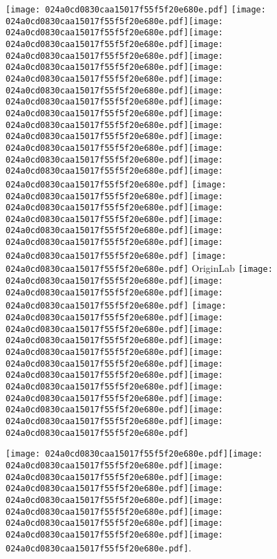 \documentclass{article}
\newcommand{\origpg}[2]{\texttt{[image: 024a0cd0830caa15017f55f5f20e680e.pdf]}}
\begin{document}
{\vspace{1.831pt}\hspace{18.094pt}\origpg6{103.4pt 145.31pt 110.82pt 161.45pt} \origpg6{121.46pt 145.31pt 132.12pt 161.45pt}\origpg6{132.07pt 145.31pt 139.91pt 161.45pt}\hspace{-0.371pt}\origpg6{139.54pt 145.31pt 146.71pt 161.45pt}\origpg6{146.76pt 145.31pt 155.39pt 161.45pt}\origpg6{155.39pt 145.31pt 163.46pt 161.45pt}\origpg6{163.38pt 145.31pt 171.45pt 161.45pt}\hspace{-0.113pt}\origpg6{171.34pt 145.31pt 178.39pt 161.45pt}\origpg6{178.33pt 145.31pt 186.96pt 161.45pt}\hspace{-0.21pt}\origpg6{186.75pt 145.31pt 194.82pt 161.45pt}\origpg6{194.92pt 145.31pt 202.99pt 161.45pt}\hspace{-0.113pt}\origpg6{202.88pt 145.31pt 210.49pt 161.45pt}\hspace{-0.387pt}\origpg6{210.11pt 145.31pt 217.27pt 161.45pt}\origpg6{217.32pt 145.31pt 225.96pt 161.45pt}\origpg6{225.96pt 145.31pt 234.59pt 161.45pt}\origpg6{234.66pt 145.31pt 241.82pt 161.45pt} \origpg6{255.36pt 145.31pt 263.58pt 161.45pt}\origpg6{263.58pt 145.31pt 270.75pt 161.45pt}\hspace{-0.21pt}\origpg6{270.54pt 145.31pt 279.17pt 161.45pt}\origpg6{279.17pt 145.31pt 287.81pt 161.45pt}\origpg6{287.87pt 145.31pt 298.72pt 161.45pt}\hspace{0.12pt}\origpg6{298.84pt 145.31pt 306.91pt 161.45pt} \origpg6{320.52pt 145.31pt 328.14pt 161.45pt} OriginLab \origpg6{422.23pt 145.31pt 430.44pt 161.45pt}\origpg6{430.44pt 145.31pt 438.5pt 161.45pt}\hspace{-0.129pt}\origpg6{438.37pt 145.31pt 445.79pt 161.45pt} \origpg6{459.54pt 145.31pt 468.18pt 161.45pt}\origpg6{468.18pt 145.31pt 476.25pt 161.45pt}\hspace{0.387pt}\origpg6{476.64pt 145.31pt 483.8pt 161.45pt}\origpg6{483.85pt 145.31pt 491.91pt 161.45pt}\origpg6{491.81pt 145.31pt 498.97pt 161.45pt}\hspace{-0.42pt}\origpg6{498.55pt 145.31pt 506.77pt 161.45pt}\origpg6{506.77pt 145.31pt 514.84pt 161.45pt}\hspace{-0.387pt}\origpg6{514.45pt 145.31pt 526.51pt 161.45pt}\origpg6{526.51pt 145.31pt 538.94pt 161.45pt}\origpg6{539pt 145.31pt 546.17pt 161.45pt}\hspace{-0.177pt}\origpg6{545.99pt 145.31pt 554.63pt 161.45pt} 

\vspace{0.656pt}\hspace{36.161pt}\origpg6{121.46pt 125.29pt 129.53pt 141.43pt}\hspace{-0.113pt}\origpg6{129.42pt 125.29pt 137.64pt 141.43pt}\origpg6{137.64pt 125.29pt 145.71pt 141.43pt}\origpg6{145.79pt 125.29pt 152.95pt 141.43pt}\origpg6{153pt 125.29pt 161.22pt 141.43pt}\origpg6{161.22pt 125.29pt 169.29pt 141.43pt}\hspace{-0.387pt}\origpg6{168.9pt 125.29pt 175.95pt 141.43pt}\origpg6{175.89pt 125.29pt 183.73pt 141.43pt}\origpg6{183.83pt 125.29pt 192.46pt 141.43pt}\hspace{-0.157pt}. 

}
\end{document}
